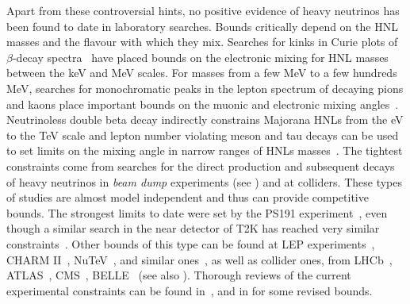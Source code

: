 Apart from these controversial hints, no positive evidence of heavy neutrinos has been found to date in laboratory searches.
Bounds critically depend on the HNL masses and the flavour with which they mix.
Searches for kinks in Curie plots of $\beta$-decay spectra~\cite{Galeazzi:2001py, Hiddemann:1995ce, Holzschuh:1999vy, %
Holzschuh:2000nj, Deutsch:1990ut} have placed bounds on the electronic mixing for HNL masses between the keV and MeV scales.  
%
For masses from a few MeV to a few hundreds MeV, searches for monochromatic peaks %
in the lepton spectrum of decaying pions and kaons place important bounds on the muonic and %
electronic mixing angles~\cite{Artamonov:2014urb, Britton:1992pg, Britton:1992xv, Aguilar-Arevalo:2017vlf, Aguilar-Arevalo:2019owf}.
Neutrinoless double beta decay indirectly constrains Majorana HNLs from the eV to the TeV scale %
and lepton number violating meson and tau decays can be used to set limits on the mixing angle %
in narrow ranges of HNLs masses~\cite{Atre:2009rg}. 
%
%
The tightest constraints come from searches for the direct production and subsequent decays of heavy neutrinos %
in \emph{beam dump} experiments (see ) and at colliders.
These types of studies are almost model independent and thus can provide competitive bounds. 
The strongest limits to date were set by the PS191 experiment~\cite{Bernardi:1985ny, Bernardi:1987ek}, %
even though a similar search in the near detector of T2K has reached very similar constraints~\cite{Abe:2019kgx}.
Other bounds of this type can be found at LEP experiments~\cite{Abreu:1996pa, Adriani:1992pq}, CHARM II~\cite{Vilain:1994vg}, %
NuTeV~\cite{Vaitaitis:1999wq}, and similar ones~\cite{Badier:1985wg, CooperSarkar:1985nh, Gallas:1994xp}, %
as well as collider ones, from LHCb~\cite{Aaij:2014aba}, ATLAS~\cite{Aaboud:2018spl}, CMS~\cite{Sirunyan:2018mtv, Sirunyan:2018xiv}, %
BELLE~\cite{Liventsev:2013zz} (see also ).
Thorough reviews of the current experimental constraints can be found in~, %
and in  for some revised bounds. 

